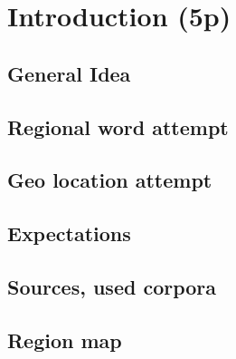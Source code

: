 \documentclass[../Main.tex]{subfiles}
\begin{document}
\section{Introduction (5p)}
\subsection{General Idea}
\subsection{Regional word attempt}
\subsection{Geo location attempt}
\subsection{Expectations}
\subsection{Sources, used corpora}
\subsection{Region map}
\end{document}
